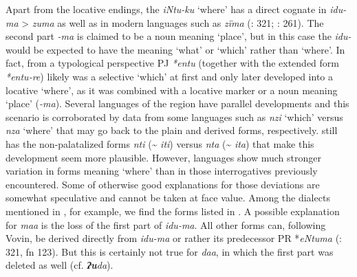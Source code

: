 Apart from the locative endings, the   \textit{iNtu-ku} ‘where’ has a direct cognate in  \textit{idu-ma} > \textit{zuma}  as well as in modern   languages such as  \textit{zïma} (\citealt{Vovin2005}: 321; \citealt{Davis2015}: 261). The second part \textit{-ma} is claimed to be a noun meaning ‘place’, but in this case the  \textit{idu-} would be expected to have the meaning ‘what’ or ‘which’ rather than ‘where’. In fact, from a typological perspective PJ \textit{*entu} (together with the extended form \textit{*entu-re}) likely was a selective  ‘which’ at first and only later developed into a locative  ‘where’, as it was combined with a locative marker or a noun meaning ‘place’ (\textit{-ma}). Several languages of the region have parallel developments and this scenario is corroborated by data from some   languages such as  \textit{nzi} ‘which’ versus \textit{nza} ‘where’ that may go back to the plain and derived forms, respectively.  still has the non-palatalized forms \textit{nti} ({\textasciitilde} \textit{iti}) versus \textit{nta} ({\textasciitilde} \textit{ita}) that make this development seem more plausible. However,   languages show much stronger variation in forms meaning ‘where’ than in those interrogatives previously encountered. Some of  otherwise good explanations for those deviations are somewhat speculative and cannot be taken at face value. Among the dialects mentioned in , for example, we find the forms listed in . A possible explanation for  \textit{maa} is the loss of the first part of \textit{idu-ma}. All other forms can, following Vovin, be derived directly from \textit{idu-ma} or rather its predecessor PR *\textit{eNtuma} (\citealt{Vovin2005}: 321, fn 123). But this is certainly not true for  \textit{daa}, in which the first part was deleted as well (cf.  \textbf{\textit{ʔu}}\textit{da}).

